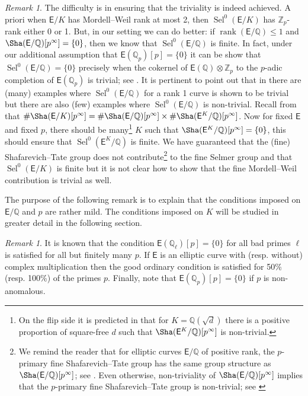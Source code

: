 \documentclass{amsart}
\numberwithin{equation}{section}
\theoremstyle{remark}
\newtheorem{remark}[theorem]{Remark}
\newcommand{\Sel}{\operatorname{Sel}}
\newcommand{\rk}{\operatorname{rank}}
\newcommand{\Zp}{\mathbb{Z}_p}
\newcommand{\Qp}{\mathbb{Q}_p}
\newcommand{\Q}{\mathbb{Q}}
\newcommand{\EC}{\mathsf{E}}
\theoremstyle{plain} %
\begin{document}
\begin{remark}
The difficulty is in ensuring that the triviality is indeed achieved.
A priori when $\EC/K$ has Mordell--Weil rank at most 2, then $\Sel^0(\EC/K)$ has $\Zp$-rank either 0 or 1.
But, in our setting we can do better: if $\rk(\EC/\Q)\leq 1$ and $\Sha(\EC/\Q)[p^\infty]=\{0\}$, then we know that $\Sel^0(\EC/\Q)$ is finite.
In fact, under our additional assumption that $\EC(\Q_p)[p]=\{0\}$ it can be show that $\Sel^0(\EC/\Q) =\{0\}$ precisely when the cokernel of $\EC(\Q)\otimes \Zp$ to the $p$-adic completion of $\EC(\Q_p)$ is trivial; see \cite[Theorem~7.1]{wuthrich2007fine}.
It is pertinent to point out that in \cite[Section~10]{Wut05} there are (many) examples where $\Sel^0(\EC/\Q)$ for a rank 1 curve is shown to be trivial but there are also (few) examples where $\Sel^0(\EC/\Q)$ is non-trivial.
Recall from \cite{Qiu14} that $\# \Sha(\EC/K)[p^\infty] = \# \Sha(\EC/\Q)[p^\infty] \times \# \Sha(\EC^K/\Q)[p^\infty]$.
Now for fixed $\EC$ and fixed $p$, there should be many\footnote{On the flip side it is predicted in \cite[Conjecture~1.1]{BKLOS21} that for $K=\Q(\sqrt{d})$ there is a positive proportion of square-free $d$ such that $\Sha(\EC^K/\Q)[p^\infty]$ is non-trivial.} $K$ such that $\Sha(\EC^K/\Q)[p^{\infty}]=\{0\}$, this should ensure that $\Sel^0(\EC^K/\Q)$ is finite.
We have guaranteed that the (fine) Shafarevich--Tate group does not contribute\footnote{We remind the reader that for elliptic curves $\EC/\Q$ of positive rank, the $p$-primary fine Shafarevich--Tate group has the same group structure as $\Sha(\EC/\Q)[p^\infty]$; see \cite[Theorem~3.5]{wuthrich2007fine}.
Even otherwise, non-triviality of $\Sha(\EC/\Q)[p^\infty]$ implies that the $p$-primary fine Shafarevich--Tate group is non-trivial; see \cite[Theorem~3.4]{wuthrich2007fine}} to the fine Selmer group and that $\Sel^0(\EC/K)$ is finite but it is not clear how to show that the fine Mordell--Weil contribution is trivial as well.
\end{remark}


The purpose of the following remark is to explain that the conditions imposed on $\EC/\Q$ and $p$ are rather mild.
The conditions imposed on $K$ will be studied in greater detail in the following section.

\begin{remark}
It is known that the condition $\EC(\Q_\ell)[p]=\{0\}$ for all bad primes $\ell$ is satisfied for all but finitely many $p$.
If $\EC$ is an elliptic curve with (resp. without) complex multiplication then the good ordinary condition is satisfied for 50\% (resp. 100\%) of the primes $p$.
Finally, note that $\EC(\Qp)[p] =\{0\}$ if $p$ is non-anomalous.
\end{remark}
\end{document}
